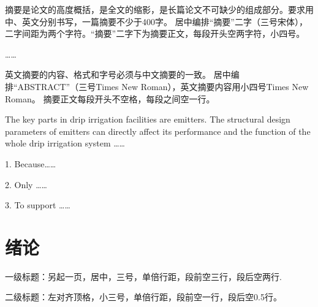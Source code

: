 \author{}{} %
\title{}{}  %




\frontmatter

\begin{abstractcn} %

摘要是论文的高度概括，是全文的缩影，是长篇论文不可缺少的组成部分。要求用中、英文分别书写，一篇摘要不少于400字。
居中编排“摘要”二字（三号宋体），二字间距为两个字符。“摘要”二字下为摘要正文，每段开头空两字符，小四号。

……


\end{abstractcn}

\keywordscn{} %

\begin{abstracten} %

英文摘要的内容、格式和字号必须与中文摘要的一致。
居中编排“ABSTRACT”（三号Times New Roman），英文摘要内容用小四号Times New Roman。
摘要正文每段开头不空格，每段之间空一行。

The key parts in drip irrigation facilities are emitters. The structural design parameters of emitters can directly affect its performance and the function of the whole drip irrigation system ……

1. Because……

2. Only ……

3. To support ……


\end{abstracten}

\keywordsen{} %
\tableofcontents %

\mainmatter

\section{绪论}
一级标题：另起一页，居中，三号，单倍行距，段前空三行，段后空两行. 

二级标题：左对齐顶格，小三号，单倍行距，段前空一行，段后空0.5行。


